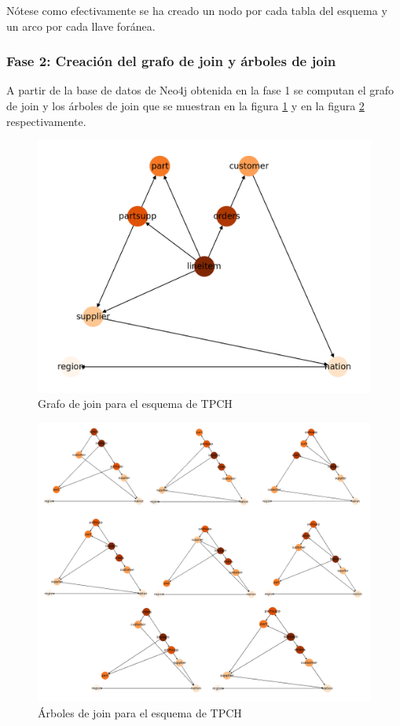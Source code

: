 N\'otese como efectivamente se ha creado un nodo por cada tabla del esquema y un arco por cada llave for\'anea.

\subsubsection{Fase 2: Creaci\'on del grafo de join y \'arboles de join}

A partir de la base de datos de Neo4j obtenida en la fase 1 se computan el grafo de join y los \'arboles de 
join que se muestran en la figura \ref{fig:graphjoin2} y en la figura \ref{fig:jointree2} respectivamente. 

\begin{figure}[H]
  \centering
  \includegraphics[scale=0.6]{Graphics/joingraph2.png}
  \caption{Grafo de join para el esquema de TPCH}
  \label{fig:graphjoin2}
\end{figure}

\begin{figure}[H]
  \centering
  \includegraphics[scale=0.4]{Graphics/jointreesexp2.png}
  \caption{\'Arboles de join para el esquema de TPCH}
  \label{fig:jointree2}
\end{figure}

